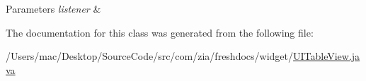 \begin{DoxyParams}{Parameters}
{\em listener} & \\
\hline
\end{DoxyParams}


The documentation for this class was generated from the following file\-:\begin{DoxyCompactItemize}
\item 
/\-Users/mac/\-Desktop/\-Source\-Code/src/com/zia/freshdocs/widget/\hyperlink{_u_i_table_view_8java}{U\-I\-Table\-View.\-java}\end{DoxyCompactItemize}

